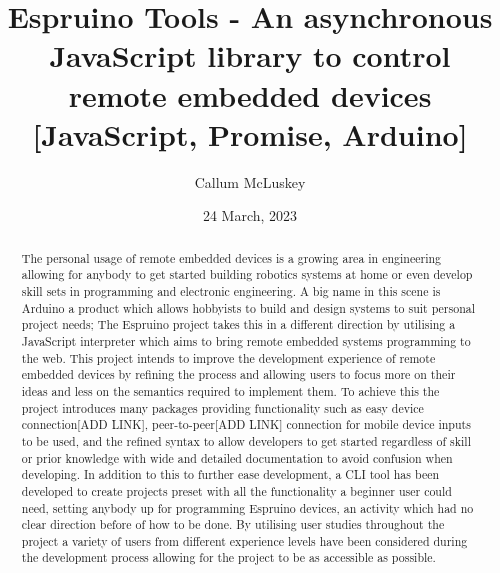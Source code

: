 \documentclass{l4proj}
\begin{document}
\title{Espruino Tools - An asynchronous JavaScript library to control remote embedded devices [JavaScript, Promise, Arduino]}
\author{Callum McLuskey}
\date{24 March, 2023}


\maketitle

\begin{abstract}

    The personal usage of remote embedded devices is a growing area in engineering allowing for anybody to get started building robotics systems at home or even develop skill sets in programming and electronic engineering. A big name in this scene is Arduino a product which allows hobbyists to build and design systems to suit personal project needs; The Espruino project takes this in a different direction by utilising a JavaScript interpreter which aims to bring remote embedded systems programming to the web. This project intends to improve the development experience of remote embedded devices by refining the process and allowing users to focus more on their ideas and less on the semantics required to implement them. To achieve this the project introduces many packages providing functionality such as easy device connection[ADD LINK], peer-to-peer[ADD LINK] connection for mobile device inputs to be used, and the refined syntax to allow developers to get started regardless of skill or prior knowledge with wide and detailed documentation to avoid confusion when developing. In addition to this to further ease development, a CLI tool has been developed to create projects preset with all the functionality a beginner user could need, setting anybody up for programming Espruino devices, an activity which had no clear direction before of how to be done. By utilising user studies throughout the project a variety of users from different experience levels have been considered during the development process allowing for the project to be as accessible as possible.

\end{abstract}

\def\consentname {Callum McLuskey} %
\def\consentdate {23 March 2023} %

\educationalconsent
\end{document}
